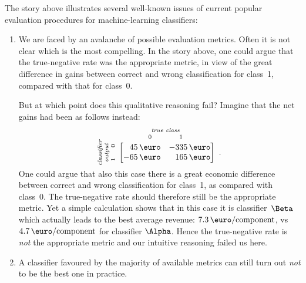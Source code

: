 \documentclass[\ifafour a4paper,12pt,\else a5paper,10pt,\fi%
onecolumn,oneside,article,%
british%
]{memoir}
\theoremstyle{remark}
\theoremstyle{innote}
\renewcommand*{\|}[1][]{\nonscript\:#1\vert\nonscript\:\mathopen{}}
\begin{document}
The story above illustrates several well-known issues of current popular evaluation procedures for machine-learning classifiers:
\begin{enumerate}%
\item We are faced by an avalanche of possible evaluation metrics. Often it is not clear which is the most compelling. In the story above, one could argue that the true-negative rate was the appropriate metric, in view of the great difference in gains between correct and wrong classification for class~1, compared with that for class~0.

  But at which point does this qualitative reasoning fail? Imagine that the net gains had been as follows instead:
\begin{equation}
  \label{eq:utility_example_2}
  \rotatebox[origin=c]{90}{
    \clap{\textit{\parbox{5em}{\centering\scriptsize classifier\\output\\$1\hspace{1.5em}0$}}
    }}\ 
    \overbracket[0pt]{
      \begin{bmatrix*}[r]
        45\,\text{\texteuro} & -335\,\text{\texteuro}  \\
        -65\,\text{\texteuro} & 165\,\text{\texteuro}
      \end{bmatrix*}}^{
      \clap{\textit{\parbox{6em}{\centering\scriptsize true class\\$0\hspace{4em}1$}}
    }} \ .
\end{equation}
One could argue that also this case there is a great economic difference between correct and wrong classification for class~1, as compared with class~0. The true-negative rate should therefore still be the appropriate metric. Yet a simple calculation shows that in this case it is classifier~$\Beta$ which actually leads to the best average revenue: $7.3\,\text{\texteuro/component}$, vs $4.7\,\text{\texteuro/component}$ for classifier $\Alpha$. Hence the true-negative rate is \emph{not} the appropriate metric and our intuitive reasoning failed us here.


\item A classifier favoured by the majority of available metrics can still turn out \emph{not} to be the best one in practice.


\end{enumerate}
\end{document}
